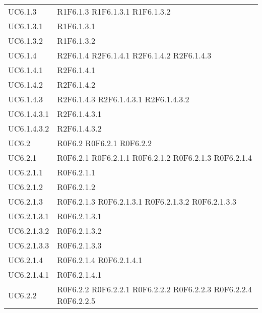 \begin{longtable}{p{2.5cm}!{\VRule[1pt]}p{5.5cm}}
UC6.1.3 & R1F6.1.3
	\newline R1F6.1.3.1
	\newline R1F6.1.3.2\\
UC6.1.3.1 & R1F6.1.3.1\\
UC6.1.3.2 & R1F6.1.3.2\\
UC6.1.4 & R2F6.1.4
	\newline R2F6.1.4.1
	\newline R2F6.1.4.2
	\newline R2F6.1.4.3\\
UC6.1.4.1 & R2F6.1.4.1\\
UC6.1.4.2 & R2F6.1.4.2\\
UC6.1.4.3 & R2F6.1.4.3
	\newline R2F6.1.4.3.1
	\newline R2F6.1.4.3.2\\
UC6.1.4.3.1 & R2F6.1.4.3.1\\
UC6.1.4.3.2 & R2F6.1.4.3.2\\
UC6.2 & R0F6.2
	\newline R0F6.2.1
	\newline R0F6.2.2\\
UC6.2.1 & R0F6.2.1
	\newline R0F6.2.1.1
	\newline R0F6.2.1.2
	\newline R0F6.2.1.3
	\newline R0F6.2.1.4\\
UC6.2.1.1 & R0F6.2.1.1\\
UC6.2.1.2 & R0F6.2.1.2\\
UC6.2.1.3 & R0F6.2.1.3
	\newline R0F6.2.1.3.1
	\newline R0F6.2.1.3.2
	\newline R0F6.2.1.3.3\\
UC6.2.1.3.1 & R0F6.2.1.3.1\\
UC6.2.1.3.2 & R0F6.2.1.3.2\\
UC6.2.1.3.3 & R0F6.2.1.3.3\\
UC6.2.1.4 & R0F6.2.1.4
	\newline R0F6.2.1.4.1\\
UC6.2.1.4.1 & R0F6.2.1.4.1\\
UC6.2.2 & R0F6.2.2
	\newline R0F6.2.2.1
	\newline R0F6.2.2.2
	\newline R0F6.2.2.3
	\newline R0F6.2.2.4
	\newline R0F6.2.2.5

\end{longtable}
